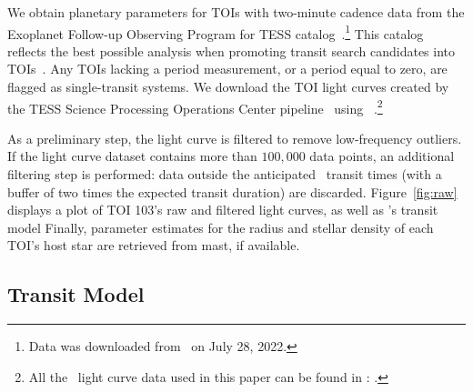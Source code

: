 \documentclass[floatfix,ApJL,twocolumn]{aastex631}
\begin{document}
We obtain planetary parameters for \numTessCandidates TOIs with two-minute cadence data from the Exoplanet Follow-up Observing Program for TESS catalog~\citep[\exofop][]{Guerrero:2021:ApJS}.\footnote{Data was downloaded from \exofopLink\ on July 28, 2022.}
This catalog reflects the best possible analysis when promoting transit search candidates into TOIs~\citep{Guerrero:2021:ApJS}.
Any TOIs lacking a period measurement, or a period equal to zero, are flagged as single-transit systems. 
We download the TOI light curves created by the TESS Science Processing Operations Center pipeline~\citep{Jenkins:2016:SPIE, Jenkins:2021:tsc2} using \lightkurve~\citep{LightkurveCollaboration:2018:ascl}.\footnote{All the \tess\ light curve data used in this paper can be found in \mast: \mastDatabase.}

As a preliminary step, the light curve is filtered to remove low-frequency outliers.
If the light curve dataset contains more than $100,000$ data points, an additional filtering step is performed: data outside the anticipated \exofop\ transit times (with a buffer of two times the expected transit duration) are discarded.
Figure~\ref{fig:raw} displays a plot of {TOI 103}'s raw and filtered light curves, as well as \exofop's transit model
Finally, parameter estimates for the radius and stellar density of each TOI's host star are retrieved from mast, if available.



\subsection{Transit Model}
\end{document}
